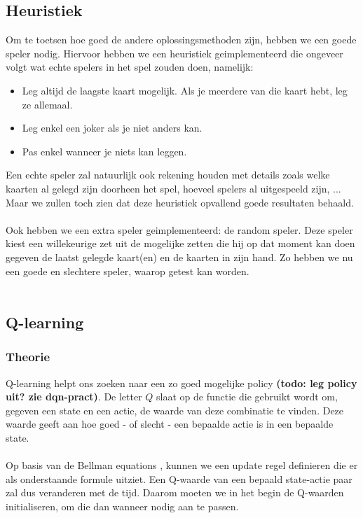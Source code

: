 \documentclass[11pt]{article}
\begin{document}
\subsection{Heuristiek}

Om te toetsen hoe goed de andere oplossingsmethoden zijn, hebben we een goede speler nodig. Hiervoor hebben we een heuristiek geimplementeerd die ongeveer volgt wat echte spelers in het spel zouden doen, namelijk:\\
\begin{itemize}
	\item Leg altijd de laagste kaart mogelijk. Als je meerdere van die kaart hebt, leg ze allemaal.
	\item Leg enkel een joker als je niet anders kan.
	\item Pas enkel wanneer je niets kan leggen.
\end{itemize}
Een echte speler zal natuurlijk ook rekening houden met details zoals welke kaarten al gelegd zijn doorheen het spel, hoeveel spelers al uitgespeeld zijn, ... Maar we zullen toch zien dat deze heuristiek opvallend goede resultaten behaald. \\\\
Ook hebben we een extra speler geimplementeerd: de random speler. Deze speler kiest een willekeurige zet uit de mogelijke zetten die hij op dat moment kan doen gegeven de laatst gelegde kaart(en) en de kaarten in zijn hand. Zo hebben we nu een goede en slechtere speler, waarop getest kan worden.\\\\

\subsection{Q-learning}
\subsubsection{Theorie}
Q-learning helpt ons zoeken naar een zo goed mogelijke policy \textbf{(todo: leg policy uit? zie dqn-pract)}. De letter $Q$ slaat op de functie die gebruikt wordt om, gegeven een state en een actie, de waarde van deze combinatie te vinden. Deze waarde geeft aan hoe goed - of slecht - een bepaalde actie is in een bepaalde state.\\\\
Op basis van de Bellman equations \cite{bellman-equations}, kunnen we een update regel definieren die er als onderstaande formule uitziet. Een Q-waarde van een bepaald state-actie paar zal dus veranderen met de tijd. Daarom moeten we in het begin de Q-waarden initialiseren, om die dan wanneer nodig aan te passen.\\\\
\end{document}
